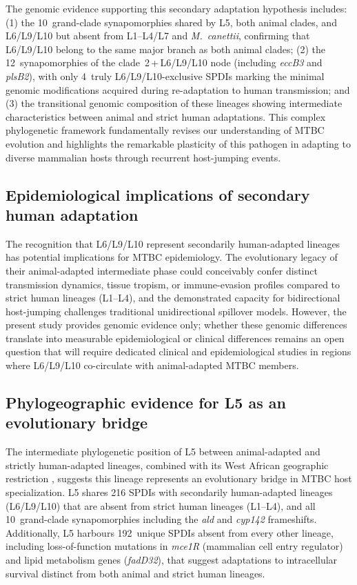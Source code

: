 \documentclass[11pt,a4paper]{article}
\begin{document}
The genomic evidence supporting this secondary adaptation hypothesis includes:
(1) the 10~grand-clade synapomorphies shared by L5, both animal clades, and
L6/L9/L10 but absent from L1--L4/L7 and \textit{M.~canettii}, confirming
that L6/L9/L10 belong to the same major branch as both animal clades;
(2) the 12~synapomorphies of the clade~2\,+\,L6/L9/L10 node (including
\textit{eccB3} and \textit{plsB2}), with only 4~truly L6/L9/L10-exclusive
SPDIs marking the minimal genomic modifications acquired during
re-adaptation to human transmission; and (3) the transitional
genomic composition of these lineages showing intermediate characteristics
between animal and strict human adaptations.
This complex phylogenetic framework fundamentally revises our understanding
of MTBC evolution and highlights the remarkable plasticity of this pathogen
in adapting to diverse mammalian hosts through recurrent host-jumping events.

\subsection{Epidemiological implications of secondary human adaptation}
\label{sec:disc:epidemiological_implications}

The recognition that L6/L9/L10 represent secondarily human-adapted lineages
has potential implications for MTBC epidemiology. The evolutionary legacy of
their animal-adapted intermediate phase could conceivably confer distinct
transmission dynamics, tissue tropism, or immune-evasion profiles compared to
strict human lineages (L1--L4), and the demonstrated capacity for
bidirectional host-jumping challenges traditional unidirectional spillover
models. However, the present study provides genomic evidence only; whether
these genomic differences translate into measurable epidemiological or
clinical differences remains an open question that will require dedicated
clinical and epidemiological studies in regions where L6/L9/L10 co-circulate
with animal-adapted MTBC members.

\subsection{Phylogeographic evidence for L5 as an evolutionary bridge}
\label{sec:disc:l5_bridge}

The intermediate phylogenetic position of L5 between animal-adapted and strictly
human-adapted lineages, combined with its West African geographic restriction
\cite{Gehre2013,YeboahManu2017}, suggests this lineage represents an evolutionary
bridge in MTBC host specialization. L5 shares 216 SPDIs with secondarily human-adapted lineages
(L6/L9/L10) that are absent from strict human lineages (L1--L4), and
all 10~grand-clade synapomorphies including the \textit{ald} and
\textit{cyp142} frameshifts.
Additionally, L5 harbours 192~unique SPDIs absent from every other lineage,
including loss-of-function mutations in \textit{mce1R} (mammalian cell entry
regulator) and lipid metabolism genes (\textit{fadD32}), that suggest
adaptations to intracellular survival distinct from both animal and strict
human lineages.
\end{document}
